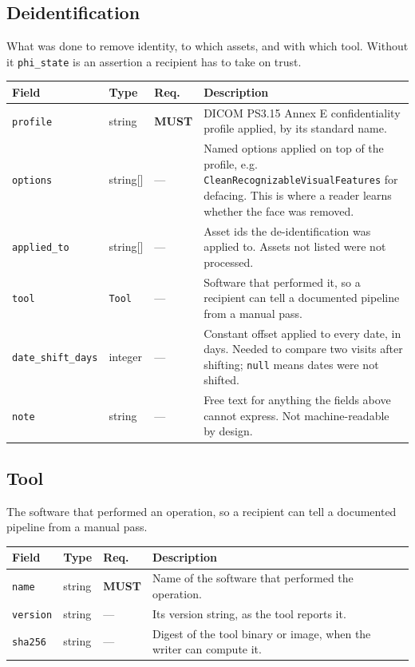 \documentclass[11pt,a4paper]{article}
\newcommand{\MUST}{\textcolor{uosred}{\textbf{MUST}}}
\newcommand{\code}[1]{\texttt{\small #1}}
\begin{document}
\subsection{Deidentification}

What was done to remove identity, to which assets, and with which tool. Without it \code{phi\_state} is an assertion a recipient has to take on trust.

\begin{longtable}{L{3.8cm} L{2.7cm} C{1.4cm} L{6.4cm}}
\toprule
\textbf{Field} & \textbf{Type} & \textbf{Req.} & \textbf{Description}\\
\midrule
\endhead
\code{profile} & string & \MUST{} & DICOM PS3.15 Annex E confidentiality profile applied, by its standard name.\\
\code{options} & string[] & --- & Named options applied on top of the profile, e.g. \code{CleanRecognizableVisualFeatures} for defacing. This is where a reader learns whether the face was removed.\\
\code{applied\_to} & string[] & --- & Asset ids the de-identification was applied to. Assets not listed were not processed.\\
\code{tool} & \code{Tool} & --- & Software that performed it, so a recipient can tell a documented pipeline from a manual pass.\\
\code{date\_shift\_days} & integer & --- & Constant offset applied to every date, in days. Needed to compare two visits after shifting; \code{null} means dates were not shifted.\\
\code{note} & string & --- & Free text for anything the fields above cannot express. Not machine-readable by design.\\
\bottomrule
\end{longtable}

\subsection{Tool}

The software that performed an operation, so a recipient can tell a documented pipeline from a manual pass.

\begin{longtable}{L{3.5cm} L{3.0cm} C{1.4cm} L{6.4cm}}
\toprule
\textbf{Field} & \textbf{Type} & \textbf{Req.} & \textbf{Description}\\
\midrule
\endhead
\code{name} & string & \MUST{} & Name of the software that performed the operation.\\
\code{version} & string & --- & Its version string, as the tool reports it.\\
\code{sha256} & string & --- & Digest of the tool binary or image, when the writer can compute it.\\
\bottomrule
\end{longtable}
\end{document}
